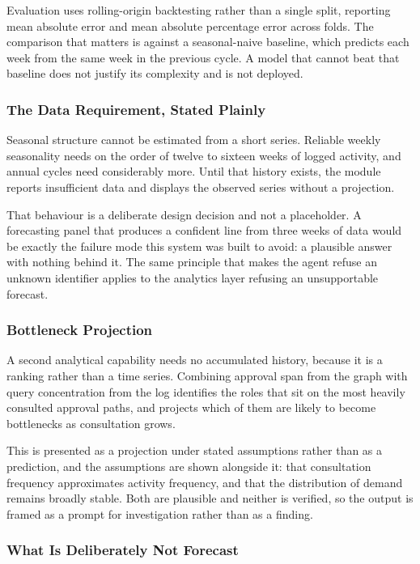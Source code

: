Evaluation uses rolling-origin backtesting rather than a single split, reporting mean absolute error and mean absolute percentage error across folds. The comparison that matters is against a seasonal-naive baseline, which predicts each week from the same week in the previous cycle. A model that cannot beat that baseline does not justify its complexity and is not deployed.

\subsubsection{The Data Requirement, Stated Plainly}

Seasonal structure cannot be estimated from a short series. Reliable weekly seasonality needs on the order of twelve to sixteen weeks of logged activity, and annual cycles need considerably more. Until that history exists, the module reports insufficient data and displays the observed series without a projection.

That behaviour is a deliberate design decision and not a placeholder. A forecasting panel that produces a confident line from three weeks of data would be exactly the failure mode this system was built to avoid: a plausible answer with nothing behind it. The same principle that makes the agent refuse an unknown identifier applies to the analytics layer refusing an unsupportable forecast.

\subsubsection{Bottleneck Projection}

A second analytical capability needs no accumulated history, because it is a ranking rather than a time series. Combining approval span from the graph with query concentration from the log identifies the roles that sit on the most heavily consulted approval paths, and projects which of them are likely to become bottlenecks as consultation grows.

This is presented as a projection under stated assumptions rather than as a prediction, and the assumptions are shown alongside it: that consultation frequency approximates activity frequency, and that the distribution of demand remains broadly stable. Both are plausible and neither is verified, so the output is framed as a prompt for investigation rather than as a finding.

\subsubsection{What Is Deliberately Not Forecast}

